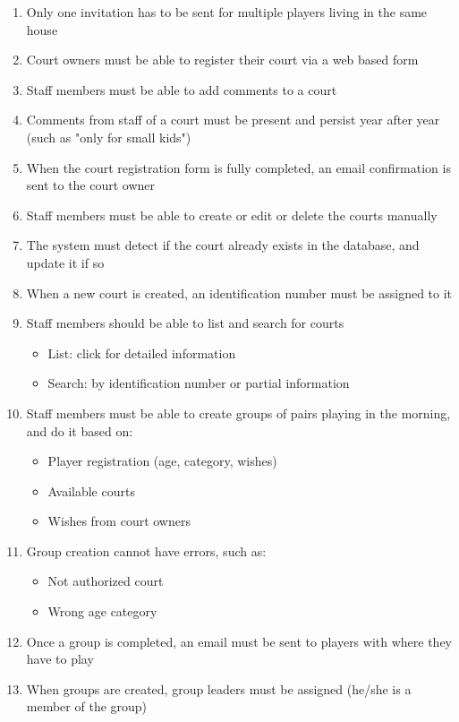 \begin{enumerate}
    	\item Only one invitation has to be sent for multiple players living in the same house
    	\item Court owners must be able to register their court via a web based form
    	\item Staff members must be able to add comments to a court
    	\item Comments from staff of a court must be present and persist year after year (such as "only for small kids")
    	\item When the court registration form is fully completed, an email confirmation is sent to the court owner
    	\item Staff members must be able to create or edit or delete the courts manually
    	\item The system must detect if the court already exists in the database, and update it if so
    	\item When a new court is created, an identification number must be assigned to it
    	\item Staff members should be able to list and search for courts
    		\begin{itemize}
    			\item List: click for detailed information
    			\item Search: by identification number or partial information
   		\end{itemize}
    \item Staff members must be able to create groups of pairs playing in the morning, and do it based on:
    		\begin{itemize}
    			\item Player registration (age, category, wishes)
    			\item Available courts
    			\item Wishes from court owners
    		\end{itemize}
    \item Group creation cannot have errors, such as:
    		\begin{itemize}
    			\item Not authorized court
    			\item Wrong age category
    		\end{itemize}
    \item Once a group is completed, an email must be sent to players with where they have to play
    \item When groups are created, group leaders must be assigned (he/she is a member of the group)

\end{enumerate}
